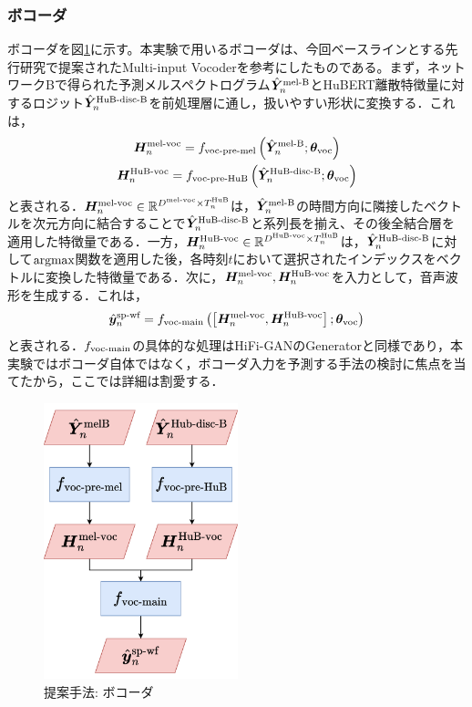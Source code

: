 \subsubsection{ボコーダ}
ボコーダを図\ref{sec4:fig:vocoder}に示す。本実験で用いるボコーダは、今回ベースラインとする先行研究\cite{choi2023intelligible}で提案されたMulti-input Vocoderを参考にしたものである。まず，ネットワークBで得られた予測メルスペクトログラム$\hat{\bm{Y}}^{\text{mel-B}}_{n}$とHuBERT離散特徴量に対するロジット$\hat{\bm{Y}}^{\text{HuB-disc-B}}_{n}$を前処理層に通し，扱いやすい形状に変換する．これは，
\begin{gather}
    \bm{H}^{\text{mel-voc}}_{n} = f_{\text{voc-pre-mel}}\left(\hat{\bm{Y}}^{\text{mel-B}}_{n}; \bm{\theta}_{\text{voc}}\right) \\
    \bm{H}^{\text{HuB-voc}}_{n} = f_{\text{voc-pre-HuB}}\left(\hat{\bm{Y}}^{\text{HuB-disc-B}}_{n}; \bm{\theta}_{\text{voc}}\right)
\end{gather}
と表される．$\bm{H}^{\text{mel-voc}}_{n} \in \mathbb{R}^{D^{\text{mel-voc}} \times T^{\text{HuB}}_{n}}$は，$\hat{\bm{Y}}^{\text{mel-B}}_{n}$の時間方向に隣接したベクトルを次元方向に結合することで$\hat{\bm{Y}}^{\text{HuB-disc-B}}_{n}$と系列長を揃え、その後全結合層を適用した特徴量である．一方，$\bm{H}^{\text{HuB-voc}}_{n} \in \mathbb{R}^{D^{\text{HuB-voc}} \times T^{\text{HuB}}_{n}}$は，$\hat{\bm{Y}}^{\text{HuB-disc-B}}_{n}$に対して$\text{argmax}$関数を適用した後，各時刻$t$において選択されたインデックスをベクトルに変換した特徴量である．次に，$\bm{H}^{\text{mel-voc}}_{n}, \bm{H}^{\text{HuB-voc}}_{n}$を入力として，音声波形を生成する．これは，
\begin{equation}
    \hat{\bm{y}}^{\text{sp-wf}}_{n} = f_{\text{voc-main}}\left(\left[\bm{H}^{\text{mel-voc}}_{n}, \bm{H}^{\text{HuB-voc}}_{n}\right]; \bm{\theta}_{\text{voc}}\right)
\end{equation}
と表される．$f_{\text{voc-main}}$の具体的な処理はHiFi-GANのGeneratorと同様であり，本実験ではボコーダ自体ではなく，ボコーダ入力を予測する手法の検討に焦点を当てたから，ここでは詳細は割愛する．

\begin{figure}[bt]
    \centering
    \includegraphics[height=80mm]{./figure/sec4/model_2/vocoder.drawio.png}
    \caption{提案手法: ボコーダ}
    \label{sec4:fig:vocoder}
\end{figure}

